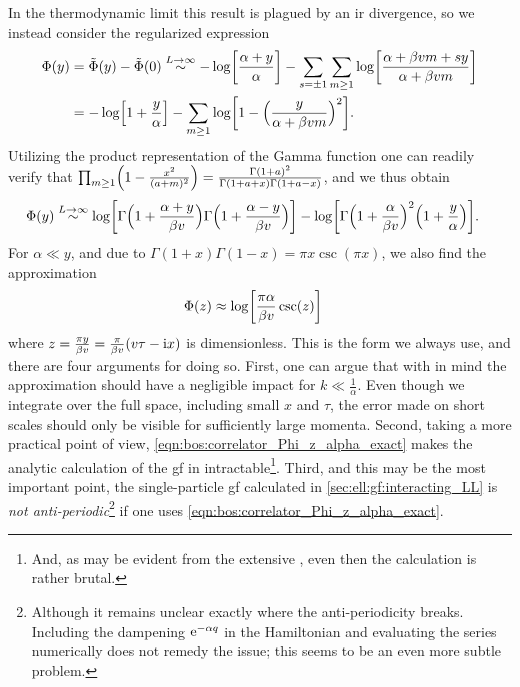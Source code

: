 In the thermodynamic limit this result is plagued by an \gls{ir} divergence, so we instead consider the regularized expression
\begin{align*}
\Phi(y) &= \tilde{\Phi}(y) - \tilde{\Phi}(0) \overset{L\rightarrow\infty}{\sim} -\log\klb*{ \frac{\alpha + y}{\alpha} } - \sum_{s=\pm 1} \sum_{m\ge 1} \log\klb*{\frac{\alpha + \beta vm + sy}{\alpha + \beta vm}}\\
&= -\log\klb*{1 + \frac{y}{\alpha}} - \sum_{m\ge 1} \log \klb*{1 - \kla[\Big]{\frac{y}{\alpha + \beta vm}}^2}.
\end{align*}
Utilizing the product representation of the Gamma function one can readily verify that $\prod_{m\ge 1} \kla*{1 - \frac{x^2}{(a+m)^2}} = \frac{\Gamma(1+a)^2}{\Gamma(1+a+x)\Gamma(1+a-x)}$, and we thus obtain
\begin{align}
\Phi(y) &\overset{L\rightarrow\infty}{\sim} \log\klb*{\Gamma\kla[\Big]{1 + \frac{\alpha + y}{\beta v}} \Gamma\kla[\Big]{1 + \frac{\alpha - y}{\beta v}}} - \log\klb*{\Gamma\kla[\Big]{1 + \frac{\alpha}{\beta v}}^2 \kla*{1 + \frac{y}{\alpha}}}. \label{eqn:bos:correlator_Phi_z_alpha_exact}
\end{align}
For $\alpha\ll y$, and due to $\Gamma(1+x)\Gamma(1-x) = \pi x \csc(\pi x)$, we also find the approximation
\begin{align}
\Phi(z) &\approx \log\klb*{\frac{\pi\alpha}{\beta v} \csc\kla{z}} \label{eqn:bos:correlator_Phi_z_alpha_log_approx}
\end{align}
where $z = \frac{\pi y}{\beta v} = \frac{\pi}{\beta v} \kla*{v \tau - \i x}$ is dimensionless.
This is the form we always use, and there are four arguments for doing so.
First, one can argue that with  in mind the approximation should have a negligible impact for $k \ll \frac{1}{\alpha}$.
Even though we integrate over the full space, including small $x$ and $\tau$, the error made on short scales should only be visible for sufficiently large momenta.
Second, taking a more practical point of view, \autoref{eqn:bos:correlator_Phi_z_alpha_exact} makes the analytic calculation of the \acrlong{gf} in \tpspace{} intractable\footnote{And, as may be evident from the extensive \sappl, even then the calculation is rather brutal.}.
Third, and this may be the most important point, the single-particle \acrlong{gf} calculated in \autoref{sec:ell:gf:interacting_LL} is \emph{not anti-periodic}\footnote{Although it remains unclear exactly where the anti-periodicity breaks. Including the dampening $\text{e}^{-\alpha q}$ in the Hamiltonian and evaluating the series numerically does not remedy the issue; this seems to be an even more subtle problem.} if one uses \autoref{eqn:bos:correlator_Phi_z_alpha_exact}.
